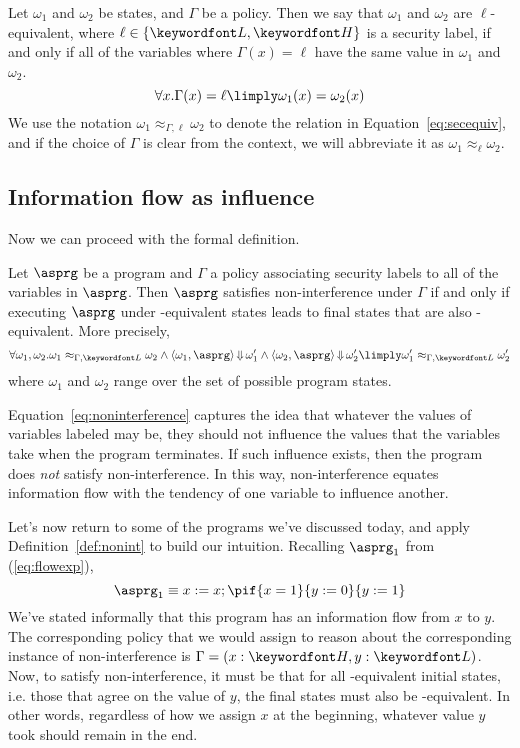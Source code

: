 \documentclass[11pt,twoside]{scrartcl}
\begin{document}
Let $\omega_1$ and $\omega_2$ be states, and $\Gamma$ be a policy. Then we say that $\omega_1$ and $\omega_2$ are $\ell$-equivalent, where $\ell \in \{\lowsec,\hisec\}$ is a security label, if and only if all of the variables where $\Gamma(x) = \ell$ have the same value in $\omega_1$ and $\omega_2$.
\begin{equation}
\label{eq:secequiv}
\forall x . \Gamma(x) = \ell \limply \omega_1(x) = \omega_2(x)
\end{equation}
We use the notation $\omega_1 \approx_{\Gamma,\ell} \omega_2$ to denote the relation in Equation~\ref{eq:secequiv}, and if the choice of $\Gamma$ is clear from the context, we will abbreviate it as $\omega_1 \approx_{\ell} \omega_2$.

\subsection{Information flow as influence}
Now we can proceed with the formal definition. 

\begin{definition}
\label{def:nonint}
Let $\asprg$ be a program and $\Gamma$ a policy associating security labels to all of the variables in $\asprg$. Then $\asprg$ satisfies non-interference under $\Gamma$ if and only if executing $\asprg$ under \lowsec-equivalent states leads to final states that are also \lowsec-equivalent. More precisely,
\begin{equation}
\label{eq:noninterference}
\forall \omega_1,\omega_2 . \omega_1 \approx_{\Gamma,\lowsec} \omega_2 \land 
\langle \omega_1, \asprg\rangle \bigstep \omega_1' \land 
\langle \omega_2, \asprg\rangle \bigstep \omega_2'
\limply
\omega_1' \approx_{\Gamma,\lowsec} \omega_2'
\end{equation}
where $\omega_1$ and $\omega_2$ range over the set of possible program states.
\end{definition}

Equation~\ref{eq:noninterference} captures the idea that whatever the values of variables labeled \hisec may be, they should not influence the values that the \lowsec variables take when the program terminates. If such influence exists, then the program does \emph{not} satisfy non-interference. In this way, non-interference equates information flow with the tendency of one variable to influence another.

Let's now return to some of the programs we've discussed today, and apply Definition~\ref{def:nonint} to build our intuition. Recalling $\asprg_1$ from (\ref{eq:flowexp}),
\[
\asprg_1 \equiv x := x; \pif{x = 1}{y:=0}{y:=1}
\]
We've stated informally that this program has an information flow from $x$ to $y$. The corresponding policy that we would assign to reason about the corresponding instance of non-interference is $\Gamma = (x : \hisec, y : \lowsec)$. Now, to satisfy non-interference, it must be that for all \lowsec-equivalent initial states, i.e. those that agree on the value of $y$, the final states must also be \lowsec-equivalent. In other words, regardless of how we assign $x$ at the beginning, whatever value $y$ took should remain in the end.
\end{document}
